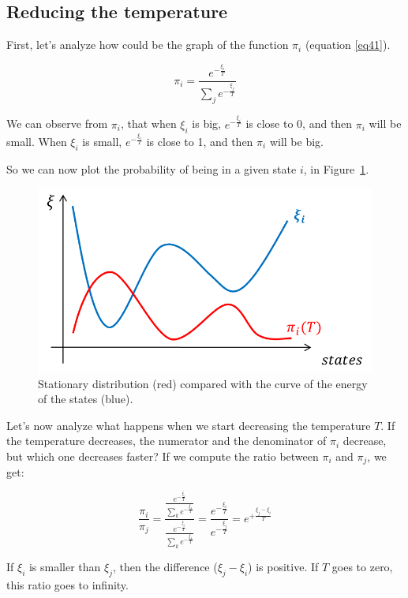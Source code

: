 \subsection{Reducing the temperature}

First, let's analyze how could be the graph of the function $\pi_i$ (equation \ref{eq41}).

$$\pi_i = \frac{e^{-{\frac{\xi_i}{T}}}}{\sum_j e^{-\frac{\xi_j}{T}}}$$

We can observe from $\pi_i$, that when $\xi_i$ is big, $e^{-{\frac{\xi_i}{T}}}$ is close to 0, and then $\pi_i$ will be small.
When $\xi_i$ is small, $e^{-{\frac{\xi_i}{T}}}$ is close to 1, and then $\pi_i$ will be big.

So we can now plot the probability of being in a given state $i$, in Figure~\ref{figur14}.

\begin{figure}[h!]
\centering
\includegraphics[scale=.7]{probabilityStatesGeneral}
\caption{Stationary distribution (red) compared with the curve of the energy of the states (blue).}
\label{figur14}
\end{figure}

Let's now analyze what happens when we start decreasing the temperature $T$. If the temperature decreases, the numerator and the denominator of $\pi_i$ decrease, but which one decreases faster? If we compute the ratio between $\pi_i$ and $\pi_j$, we get:

$$\frac{\pi_i}{\pi_j}=\frac{\frac{e^{-{\frac{\xi_i}{T}}}}{\sum_k e^{-\frac{\xi_k}{T}}}}{\frac{e^{-{\frac{\xi_j}{T}}}}{\sum_k e^{-\frac{\xi_k}{T}}}}=\frac{e^{-{\frac{\xi_i}{T}}}}{e^{-{\frac{\xi_j}{T}}}}=e^{+{\frac{\xi_j-\xi_i}{T}}}$$

If $\xi_i$ is smaller than $\xi_j$, then the difference ($\xi_j-\xi_i$) is positive. If $T$ goes to zero, this ratio goes to infinity. 

